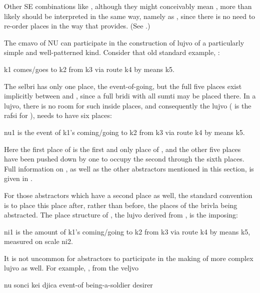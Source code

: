 Other SE combinations like , although they might
    conceivably mean , more than likely should be
    interpreted in the same way, namely as , since
    there is no need to re-order places in the way that 
    provides. (See .)



The cmavo of NU can participate in the construction of lujvo
    of a particularly simple and well-patterned kind. Consider that
    old standard example, :
\begin{example}
k1 comes/goes to k2 from k3 via route k4 by means k5.
\end{example}

The selbri  has only one place, the
    event-of-going, but the full five places exist implicitly
    between  and , since a full bridi with all sumti
    may be placed there. In a lujvo, there is no room for such
    inside places, and consequently the lujvo  (
    is the rafsi for ), needs to have six places:
\begin{example}
nu1 is the event of k1's coming/going to k2 from k3\n
\T	via route k4 by means k5.
\end{example}

Here the first place of  is the first and only
    place of , and the other five places have been pushed
    down by one to occupy the second through the sixth places. Full
    information on , as well as the other abstractors
    mentioned in this section, is given in .

For those abstractors which have a second place as well, the
    standard convention is to place this place after, rather than
    before, the places of the brivla being abstracted. The place
    structure of , the lujvo derived from ,
    is the imposing:
\begin{example}
ni1 is the amount of k1's coming/going to k2 from k3\n
\T	via route k4 by means k5, measured on scale ni2.
\end{example}

It is not uncommon for abstractors to participate in the
    making of more complex lujvo as well. For example,
    , from the veljvo
\begin{example}
nu sonci kei djica\n
event-of being-a-soldier desirer
\end{example}

